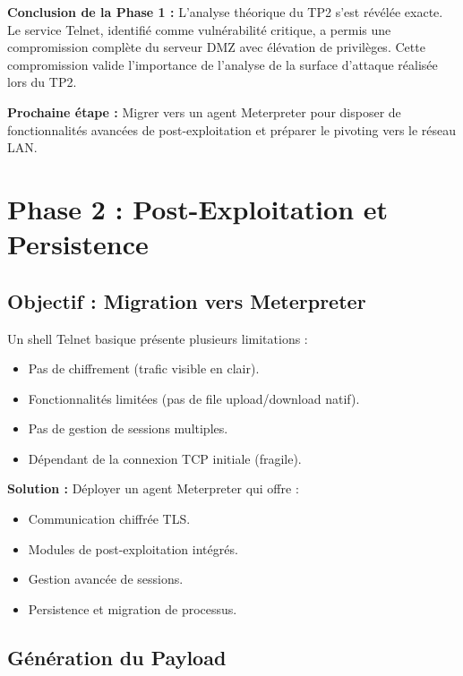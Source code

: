 \documentclass[12pt,a4paper,openany]{report}
\begin{document}
\textbf{Conclusion de la Phase 1 :} L'analyse théorique du TP2 s'est révélée exacte. Le service Telnet, identifié comme vulnérabilité critique, a permis une compromission complète du serveur DMZ avec élévation de privilèges. Cette compromission valide l'importance de l'analyse de la surface d'attaque réalisée lors du TP2.

\textbf{Prochaine étape :} Migrer vers un agent Meterpreter pour disposer de fonctionnalités avancées de post-exploitation et préparer le pivoting vers le réseau LAN.
	
	\chapter{Phase 2 : Post-Exploitation et Persistence}
	
	\section{Objectif : Migration vers Meterpreter}
	
	Un shell Telnet basique présente plusieurs limitations :
	\begin{itemize}
		\item Pas de chiffrement (trafic visible en clair).
		\item Fonctionnalités limitées (pas de file upload/download natif).
		\item Pas de gestion de sessions multiples.
		\item Dépendant de la connexion TCP initiale (fragile).
	\end{itemize}
	
	\textbf{Solution :} Déployer un agent Meterpreter qui offre :
	\begin{itemize}
		\item Communication chiffrée TLS.
		\item Modules de post-exploitation intégrés.
		\item Gestion avancée de sessions.
		\item Persistence et migration de processus.
	\end{itemize}
	
	\section{Génération du Payload}
	
\end{document}
